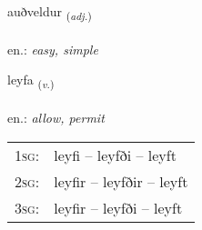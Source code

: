 \documentclass[frontgrid, backgrid]{flacards}\usepackage[]{graphicx}\usepackage[]{xcolor}
\begin{document}
\renewcommand{\flhead}{\vskip5pt \fboxsep=0pt {\small\bfseries\footnotesize Lýsingarorð | Adjective}}
\renewcommand{\fcfoot}{\vskip5pt \fboxsep=0pt \hspace{2pt}{\small\bfseries\footnotesize 1K}}

\renewcommand{\blhead}{\vskip5pt {\small\bfseries\footnotesize Lýsingarorð | Adjective }}
\renewcommand{\bcfoot}{\vskip5pt \hspace{2pt}{\small\bfseries\footnotesize 1K}}


{auðveldur \small{\textsubscript{(\textit{adj.})}} \\[1ex] %
\textphonetic{[œiðvɛltʏr]} \\
en.: \emph{easy, simple} \\  [2ex]
\renewcommand*{\arraystretch}{0.8}
}

\renewcommand{\flhead}{\vskip5pt \fboxsep=0pt {\small\bfseries\footnotesize Sagnorð | Verb}}
\renewcommand{\fcfoot}{\vskip5pt \fboxsep=0pt \hspace{2pt}{\small\bfseries\footnotesize 1K}}

\renewcommand{\blhead}{\vskip5pt {\small\bfseries\footnotesize Sagnorð | Verb }}
\renewcommand{\bcfoot}{\vskip5pt \hspace{2pt}{\small\bfseries\footnotesize 1K}}


{leyfa \small{\textsubscript{(\textit{v.})}} \\[1ex] %
\textphonetic{[leiːva]} \\
en.: \emph{allow, permit} \\  [2ex]
\renewcommand*{\arraystretch}{0.8}
\begin{tabular}{p{1cm}l}
\textsc{1sg}: & leyfi -- leyfði -- leyft \\ 
\textsc{2sg}: & leyfir -- leyfðir -- leyft \\ 
\textsc{3sg}: & leyfir -- leyfði -- leyft \\ 
\end{tabular}
}
\end{document}
